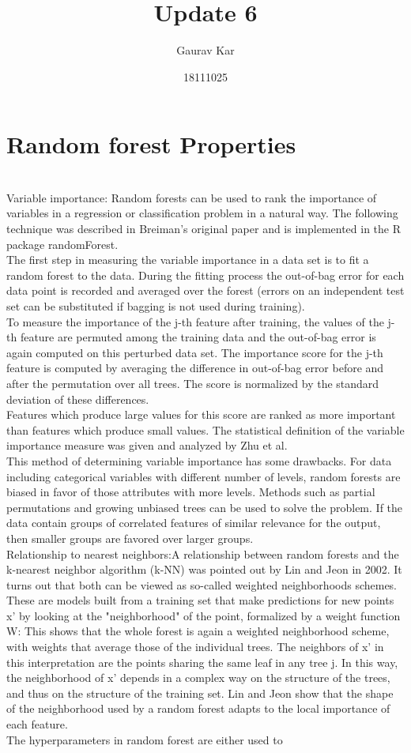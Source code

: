 \documentclass{article}
\title{Update 6}
\author{Gaurav Kar}
\date{18111025}
\begin{document}
\maketitle

\section{Random forest Properties}\\Variable importance: Random forests can be used to rank the importance of variables in a regression or classification problem in a natural way. The following technique was described in Breiman's original paper and is implemented in the R package randomForest.\\The first step in measuring the variable importance in a data set is to fit a random forest to the data. During the fitting process the out-of-bag error for each data point is recorded and averaged over the forest (errors on an independent test set can be substituted if bagging is not used during training).\\To measure the importance of the j-th feature after training, the values of the j-th feature are permuted among the training data and the out-of-bag error is again computed on this perturbed data set. The importance score for the j-th feature is computed by averaging the difference in out-of-bag error before and after the permutation over all trees. The score is normalized by the standard deviation of these differences.\\Features which produce large values for this score are ranked as more important than features which produce small values. The statistical definition of the variable importance measure was given and analyzed by Zhu et al.\\This method of determining variable importance has some drawbacks. For data including categorical variables with different number of levels, random forests are biased in favor of those attributes with more levels. Methods such as partial permutations and growing unbiased trees can be used to solve the problem. If the data contain groups of correlated features of similar relevance for the output, then smaller groups are favored over larger groups.\\Relationship to nearest neighbors:A relationship between random forests and the k-nearest neighbor algorithm (k-NN) was pointed out by Lin and Jeon in 2002. It turns out that both can be viewed as so-called weighted neighborhoods schemes. These are models built from a training set  that make predictions for new points x' by looking at the "neighborhood" of the point, formalized by a weight function W: This shows that the whole forest is again a weighted neighborhood scheme, with weights that average those of the individual trees. The neighbors of x' in this interpretation are the points sharing the same leaf in any tree j. In this way, the neighborhood of x' depends in a complex way on the structure of the trees, and thus on the structure of the training set. Lin and Jeon show that the shape of the neighborhood used by a random forest adapts to the local importance of each feature.\\The hyperparameters in random forest are either used to 
\end{document}
